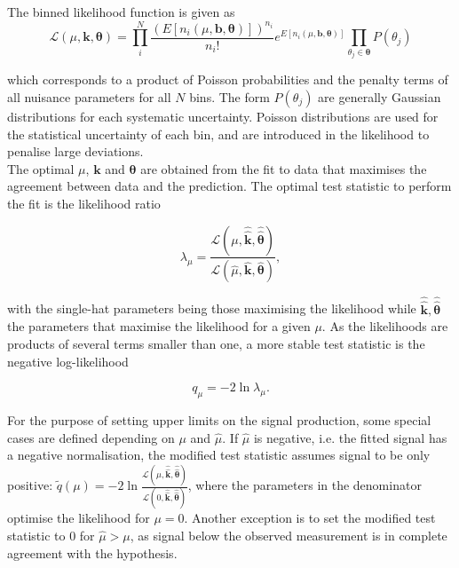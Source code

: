 The binned likelihood function is given as
\begin{equation}
    \mathscr{L}(\mu,\mathbf{k},\boldsymbol{\theta}) = \prod_i^N \frac{ (E[n_i(\mu,\mathbf{b},\boldsymbol{\theta})])^{n_i}}{n_i!}e^{E[n_i(\mu,\mathbf{b},\boldsymbol{\theta})]}\prod_{\theta_j\in\boldsymbol{\theta}}P(\theta_j)
\end{equation}

which corresponds to a product of Poisson probabilities and the penalty terms of all nuisance parameters for all $N$ bins. The form $P(\theta_j)$ are generally Gaussian distributions for each systematic uncertainty. Poisson distributions are used for the statistical uncertainty of each bin, and are introduced in the likelihood to penalise large deviations.\\

The optimal $\mu$, $\mathbf{k}$ and $\boldsymbol{\theta}$ are obtained from the fit to data that maximises the agreement between data and the prediction. The optimal test statistic to perform the fit is the likelihood ratio %

\begin{equation}
    \lambda_\mu = \frac{\mathscr{L}(\mu, \hat{\hat{\mathbf{k}}},\hat{\hat{\boldsymbol{\theta}}})}{\mathscr{L}(\hat{\mu}, \hat{\mathbf{k}},\hat{\boldsymbol{\theta}})},
\end{equation}

with the single-hat parameters being those maximising the likelihood while $\hat{\hat{\mathbf{k}}},\hat{\hat{\boldsymbol{\theta}}}$ the parameters that maximise the likelihood for a given $\mu$. As the likelihoods are products of several terms smaller than one, a more stable test statistic is the negative log-likelihood

\begin{equation}
    q_\mu = -2\ln\lambda_\mu.
\end{equation}

For the purpose of setting upper limits on the signal production, some special cases are defined depending on $\mu$ and $\hat{\mu}$. If $\hat{\mu}$ is negative, i.e. the fitted signal has a negative normalisation, the modified test statistic assumes signal to be only positive: $\tilde{q}(\mu)=-2\ln\frac{\mathscr{L}(\mu, \hat{\hat{\mathbf{k}}},\hat{\hat{\boldsymbol{\theta}}})}{\mathscr{L}(0, \hat{\hat{\mathbf{k}}},\hat{\hat{\boldsymbol{\theta}}})}$, where the parameters in the denominator optimise the likelihood for $\mu=0$. Another exception is to set the modified test statistic to 0 for $\hat{\mu}>\mu$, as signal below the observed measurement is in complete agreement with the hypothesis.\\

